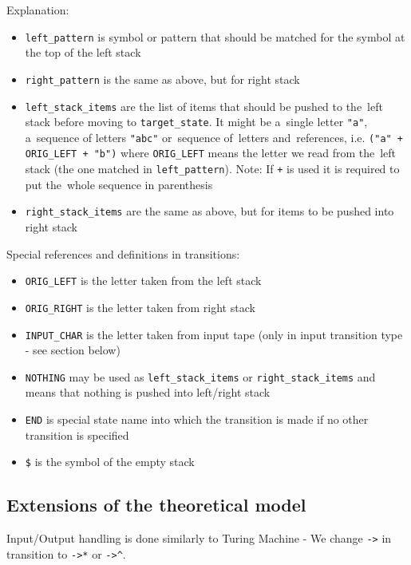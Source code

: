 \documentclass[english,shortabstract,mgr]{iithesis}
\begin{document}
Explanation:
\begin{itemize}
  \item \texttt{left\_pattern} is symbol or pattern that should be matched
      for the symbol at the top of the left stack
  \item \texttt{right\_pattern} is the same as above, but for right stack
  \item \texttt{left\_stack\_items} are the list of items that should be pushed
      to the~left stack before moving to \texttt{target\_state}. It might be
      a~single letter \texttt{"a"}, a~sequence of letters \texttt{"abc"}
      or~sequence of~letters and~references, i.e. \texttt{("a" + ORIG\_LEFT + "b")}
      where \texttt{ORIG\_LEFT} means the letter we read from the~left stack (the one matched
      in \texttt{left\_pattern}). Note: If \texttt{+} is used it is required to put
      the~whole sequence in parenthesis
  \item \texttt{right\_stack\_items} are the same as above, but for items to be pushed into right stack
\end{itemize}

Special references and definitions in transitions:
\begin{itemize}
  \item \texttt{ORIG\_LEFT} is the letter taken from the left stack
  \item \texttt{ORIG\_RIGHT} is the letter taken from right stack
  \item \texttt{INPUT\_CHAR} is the letter taken from input tape
      (only in input transition type - see section below)
  \item \texttt{NOTHING} may be used as \texttt{left\_stack\_items} or \texttt{right\_stack\_items}
      and means that nothing is pushed into left/right stack
  \item \texttt{END} is special state name into which the transition is made if no other transition is specified
  \item \texttt{\$} is the symbol of the empty stack
\end{itemize}

\subsection {Extensions of the theoretical model}

Input/Output handling is done similarly to Turing Machine - We change \texttt{->} in transition
to \texttt{->*} or \texttt{->\^}.
\end{document}
